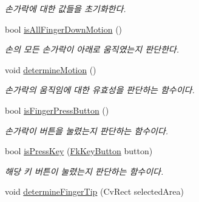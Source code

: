 \begin{DoxyCompactItemize}
\begin{DoxyCompactList}\small\item\em 손가락에 대한 값들을 초기화한다. \end{DoxyCompactList}\item 
\hypertarget{class_fk_hand_aef9e464be657d506569dffd63daa11ca}{}bool \hyperlink{class_fk_hand_aef9e464be657d506569dffd63daa11ca}{is\+All\+Finger\+Down\+Motion} ()\label{class_fk_hand_aef9e464be657d506569dffd63daa11ca}

\begin{DoxyCompactList}\small\item\em 손의 모든 손가락이 아래로 움직였는지 판단한다. \end{DoxyCompactList}\item 
\hypertarget{class_fk_hand_a95bacd95a540a3a8edb7a6455fd7cee8}{}void \hyperlink{class_fk_hand_a95bacd95a540a3a8edb7a6455fd7cee8}{determine\+Motion} ()\label{class_fk_hand_a95bacd95a540a3a8edb7a6455fd7cee8}

\begin{DoxyCompactList}\small\item\em 손가락의 움직임에 대한 유효성을 판단하는 함수이다. \end{DoxyCompactList}\item 
\hypertarget{class_fk_hand_af280a45f13d591410c9f84a159cd111e}{}bool \hyperlink{class_fk_hand_af280a45f13d591410c9f84a159cd111e}{is\+Finger\+Press\+Button} ()\label{class_fk_hand_af280a45f13d591410c9f84a159cd111e}

\begin{DoxyCompactList}\small\item\em 손가락이 버튼을 눌렸는지 판단하는 함수이다. \end{DoxyCompactList}\item 
\hypertarget{class_fk_hand_a78c703407e97e73c196425c7e51992ab}{}bool \hyperlink{class_fk_hand_a78c703407e97e73c196425c7e51992ab}{is\+Press\+Key} (\hyperlink{class_fk_key_button}{Fk\+Key\+Button} button)\label{class_fk_hand_a78c703407e97e73c196425c7e51992ab}

\begin{DoxyCompactList}\small\item\em 해당 키 버튼이 눌렸는지 판단하는 함수이다. \end{DoxyCompactList}\item 
\hypertarget{class_fk_hand_a949b3c0ce6a30f9d248e3f0d0899f902}{}void \hyperlink{class_fk_hand_a949b3c0ce6a30f9d248e3f0d0899f902}{determine\+Finger\+Tip} (Cv\+Rect selected\+Area)\label{class_fk_hand_a949b3c0ce6a30f9d248e3f0d0899f902}


\end{DoxyCompactItemize}
